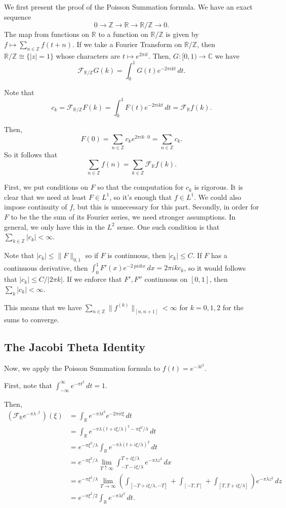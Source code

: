 \documentclass[12pt]{scrartcl}
\newcommand{\Z}{\mathbb{Z}}
\newcommand{\R}{\mathbb{R}}
\newcommand{\C}{\mathbb C}
\let \mc \mathcal
\begin{document}
We first present the proof of the Poisson Summation formula.   We have an exact sequence
$$0 \to \Z \to \R \to \R/\Z \to 0.$$
The map from functions on $\R$ to a function on $\R / \Z$ is given by $f \mapsto \sum_{n \in \Z} f(t + n)$.  If we take a Fourier Transform on $\R / \Z$, then $\R/\Z \cong \{|z| = 1\}$ whose characters are $t \mapsto e^{2\pi i t}$.  Then, $G:[0, 1) \to \C$ we have
$$\mc F_{\R/\Z} G(k) = \int_0^1 G(t) e^{-2\pi i k t}\,dt.$$

Note that $$c_k = \mc F_{\R / \Z} F(k) = \int_0^1 F(t) e^{-2 \pi i k t} \,dt = \mc F_{\R} f(k).$$

Then,
$$F(0) = \sum_{n \in \Z} c_k e^{2\pi i k \cdot 0} = \sum_{n \in \Z} c_k.$$
So it follows that 
$$\sum_{n \in \Z} f(n) = \sum_{k \in \Z} \mc F_{\R} f(k).$$

First, we put conditions on $F$ so that the computation for $c_k$ is rigorous.  It is clear that we need at least $F \in L^1$, so it's enough that $f \in L^1$.  We could also impose continuity of $f$, but this is unnecessary for this part.  
Secondly, in order for $F$ to be the the sum of its Fourier series, we need stronger assumptions.  In general, we only have this in the $L^2$ sense.  One such condition is that $\sum_{k \in \Z} |c_k| < \infty$.

Note that $|c_k| \le \|F\|_{0, 1}$ so if $F$ is continuous, then $|c_k| \le C$.  If $F$ has a continuous derivative, then 
$\int_0^1 F'(x) e^{-2\ pi i k x}\,dx = 2 \pi i k c_k$, so it would follows that $|c_k| \le C/|2 \pi k|$.  If we enforce that $F', F''$ continuous on $[0, 1]$, then $\sum_k |c_k| <\infty$.

This means that we have $\sum_{n \in \Z} \|f ^{(k)}\|_{[n, n + 1]} < \infty$ for $k = 0, 1, 2$ for the sums to converge.  

\subsection{The Jacobi Theta Identity}
Now, we apply the Poisson Summation formula to $f(t) = e^{-\lambda t^2}$.  

First, note that 
$\int_{-\infty}^\infty e^{-\pi t^2}\,dt = 1$.  

Then,
\begin{align*}
(\mc F_{\R} e^{-\pi \lambda \cdot ^2})(\xi) &= \int_\R e^{-\pi \lambda t^2} e^{-2\pi i t \xi} \,dt \\
&= \int_\R e^{-\pi \lambda(t + i\xi/\lambda)^2 - \pi \xi^2/\lambda} \,dt \\
&= e^{-\pi \xi^2/\lambda} \int_\R e^{-\pi \lambda (t + i \xi/\lambda)^2}\,dt \\
&= e^{-\pi \xi^2/\lambda} \lim_{T \uparrow \infty} \int_{-T - i\xi/\lambda}^{T + i \xi/\lambda} e^{- \pi \lambda z^2}\,dx \\
&= e^{- \pi \xi^2/\lambda} \lim_{T \to \infty} (\int_{[-T + i\xi/\lambda, -T]} + \int_{[-T, T]} + \int_{[T, T + i \xi/\lambda]}) e^{- \pi \lambda z^2}\,dz \\
&= e^{- \pi \xi^2/2} \int_\R e^{-\pi \lambda t^2}\,dt.
\end{align*}
\end{document}

